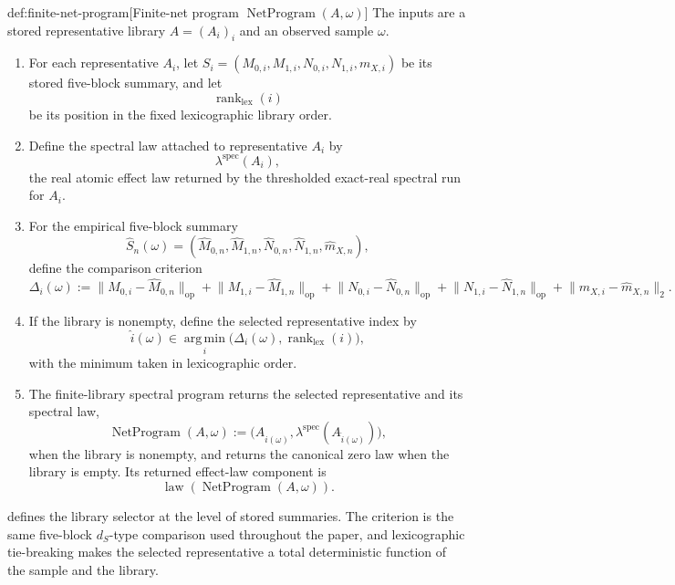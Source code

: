 \documentclass[11pt]{article}
\begin{document}
\begin{algorithmv}{def:finite-net-program}[Finite-net program \(\operatorname{NetProgram}(A,\omega)\)]
The inputs are a stored representative library \(A=(A_i)_i\) and an observed sample \(\omega\).
\begin{enumerate}
\item For each representative \(A_i\), let \(S_i=(M_{0,i},M_{1,i},N_{0,i},N_{1,i},m_{X,i})\) be its stored five-block summary, and let
\[
\operatorname{rank}_{\mathrm{lex}}(i)
\]
be its position in the fixed lexicographic library order.

\item Define the spectral law attached to representative \(A_i\) by
\[
\lambda^{\mathrm{spec}}(A_i),
\]
the real atomic effect law returned by the thresholded exact-real spectral run for \(A_i\).

\item For the empirical five-block summary
\[
\widehat S_n(\omega)
=
(\widehat M_{0,n},\widehat M_{1,n},\widehat N_{0,n},\widehat N_{1,n},\widehat m_{X,n}),
\]
define the comparison criterion
\[
\Delta_i(\omega)
:=
\lVert M_{0,i}-\widehat M_{0,n}\rVert_{\mathrm{op}}
+
\lVert M_{1,i}-\widehat M_{1,n}\rVert_{\mathrm{op}}
+
\lVert N_{0,i}-\widehat N_{0,n}\rVert_{\mathrm{op}}
+
\lVert N_{1,i}-\widehat N_{1,n}\rVert_{\mathrm{op}}
+
\lVert m_{X,i}-\widehat m_{X,n}\rVert_2.
\]

\item If the library is nonempty, define the selected representative index by
\[
\widehat i(\omega)
\in
\operatorname*{arg\,min}_{i}
\bigl(\Delta_i(\omega),\operatorname{rank}_{\mathrm{lex}}(i)\bigr),
\]
with the minimum taken in lexicographic order.

\item The finite-library spectral program returns the selected representative and its spectral law,
\[
\operatorname{NetProgram}(A,\omega)
:=
\bigl(A_{\widehat i(\omega)},\lambda^{\mathrm{spec}}(A_{\widehat i(\omega)})\bigr),
\]
when the library is nonempty, and returns the canonical zero law when the library is empty. Its returned effect-law component is
\[
\operatorname{law}(\operatorname{NetProgram}(A,\omega)).
\]
\end{enumerate}
\end{algorithmv}

 defines the library selector at the level of stored summaries. The criterion is the same five-block \(d_S\)-type comparison used throughout the paper, and lexicographic tie-breaking makes the selected representative a total deterministic function of the sample and the library.
\end{document}
